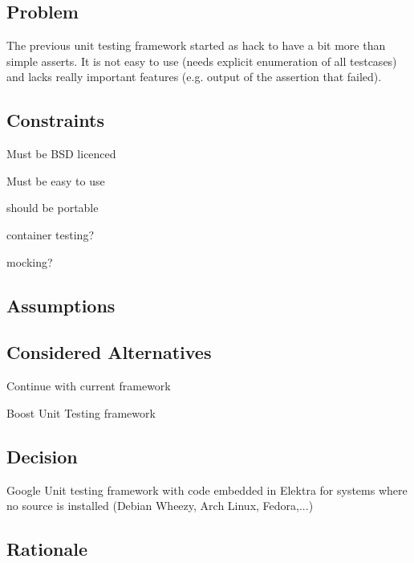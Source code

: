 \subsection*{Problem}

The previous unit testing framework started as hack to have a bit more than simple asserts. It is not easy to use (needs explicit enumeration of all testcases) and lacks really important features (e.\+g. output of the assertion that failed).

\subsection*{Constraints}


\begin{DoxyItemize}
\item Must be B\+SD licenced
\item Must be easy to use
\item should be portable
\item container testing?
\item mocking?
\end{DoxyItemize}

\subsection*{Assumptions}

\subsection*{Considered Alternatives}


\begin{DoxyItemize}
\item Continue with current framework
\item Boost Unit Testing framework
\end{DoxyItemize}

\subsection*{Decision}


\begin{DoxyItemize}
\item Google Unit testing framework with code embedded in Elektra for systems where no source is installed (Debian Wheezy, Arch Linux, Fedora,...)
\end{DoxyItemize}

\subsection*{Rationale}


